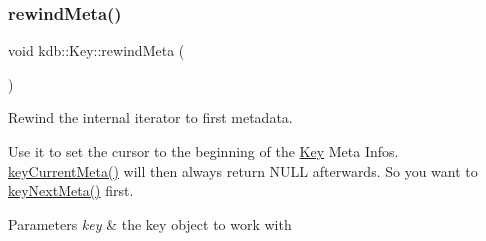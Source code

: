 \subsubsection{\texorpdfstring{rewindMeta()}{rewindMeta()}}
{\footnotesize\ttfamily void kdb\+::\+Key\+::rewind\+Meta (\begin{DoxyParamCaption}{ }\end{DoxyParamCaption})\hspace{0.3cm}{\ttfamily [inline]}}



Rewind the internal iterator to first metadata. 

Use it to set the cursor to the beginning of the \mbox{\hyperlink{classkdb_1_1Key}{Key}} Meta Infos. \mbox{\hyperlink{group__keymeta_ga74a273f529030f4947df52e14fdd2869}{key\+Current\+Meta()}} will then always return N\+U\+LL afterwards. So you want to \mbox{\hyperlink{group__keymeta_ga4c88342f580a4291455a801af71ce048}{key\+Next\+Meta()}} first.


\begin{DoxyCode}{0}
\DoxyCodeLine{}
\DoxyCodeLine{\{}
\DoxyCodeLine{\}}
\end{DoxyCode}



\begin{DoxyParams}{Parameters}
{\em key} & the key object to work with \\
\hline
\end{DoxyParams}

